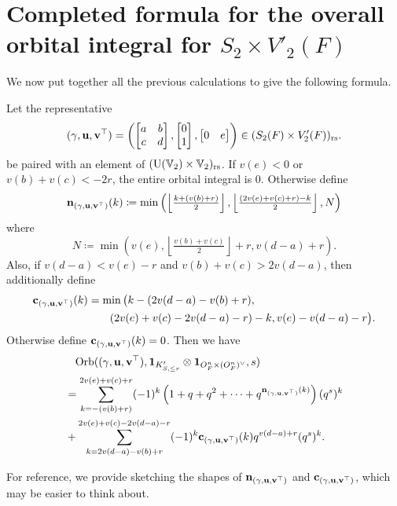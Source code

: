 \section{Completed formula for the overall orbital integral for $S_2 \times V'_2(F)$}
We now put together all the previous calculations to give the following formula.
\begin{theorem}
  \label{thm:semi_lie_formula}
  Let the representative
  \[
    {(\gamma, \mathbf u, \mathbf v^\top)} = \left( \begin{bmatrix} a & b \\ c & d \end{bmatrix},
      \begin{bmatrix} 0 \\ 1 \end{bmatrix},
      \begin{bmatrix} 0 & e \end{bmatrix} \right)
    \in (S_2(F) \times V_2'(F))_{\mathrm{rs}}.
  \]
  be paired with an element of $(\operatorname{U}(\mathbb V_2) \times \mathbb V_2)_{\mathrm{rs}}$.
  If $v(e) < 0$ or $v(b) + v(c) < -2r$, the entire orbital integral is $0$.
  Otherwise define
  \[ \mathbf n_{(\gamma, \mathbf u, \mathbf v^\top)}(k) \coloneqq \min\left( \left\lfloor \tfrac{k + (v(b)+r)}{2} \right\rfloor,
    \left\lfloor \tfrac{(2v(e)+v(c)+r)-k}{2} \right\rfloor, N \right) \]
  where
  \[ N \coloneqq \min \left(
      v(e), \left\lfloor \tfrac{v(b)+v(c)}{2} \right\rfloor + r,
      v(d-a) + r \right). \]
  Also, if $v(d-a) < v(e) - r$ and $v(b) + v(c) > 2v(d-a)$, then additionally define
  \begin{align*}
    \mathbf c_{(\gamma, \mathbf u, \mathbf v^\top)}(k) &= \min\big( k - (2v(d-a)-v(b)+r), \\
      &\qquad (2v(e)+v(c)-2v(d-a)-r)-k, v(e)-v(d-a)-r \big).
  \end{align*}
  Otherwise define $\mathbf c_{(\gamma, \mathbf u, \mathbf v^\top)}(k) = 0$.
  Then we have
  \begin{align*}
    &\phantom= \Orb(\guv, \mathbf{1}_{K'_{S, \le r}} \otimes \oneV, s) \\
    &= \sum_{k = -(v(b)+r)}^{2v(e)+v(c)+r} (-1)^k
    \left( 1 + q + q^2 + \dots + q^{\nn_\guv(k)} \right) (q^s)^k \\
    &+ \sum_{k = 2v(d-a)-v(b)+r}^{2v(e)+v(c)-2v(d-a)-r} (-1)^k \cc_\guv(k) q^{v(d-a) + r} (q^s)^k.
  \end{align*}
\end{theorem}

For reference, we provide  sketching the shapes
of $\mathbf n_{(\gamma, \mathbf u, \mathbf v^\top)}$ and $\mathbf c_{(\gamma, \mathbf u, \mathbf v^\top)}$, which may be easier to think about.

